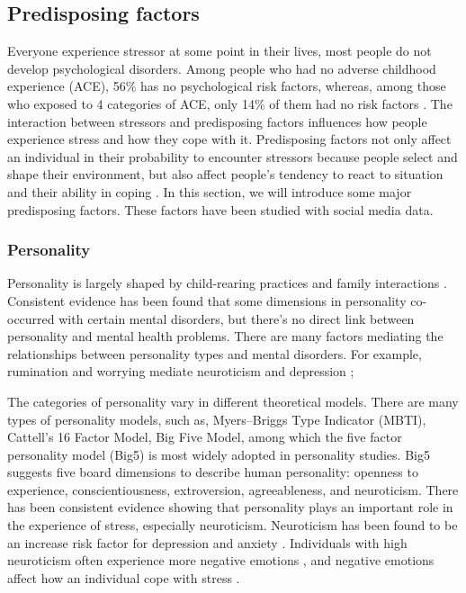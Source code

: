 \subsection{Predisposing factors}
Everyone experience stressor at some point in their lives, most people do not develop psychological disorders. Among people who had no adverse childhood experience (ACE), 56\% has no psychological risk factors, whereas, among those who exposed to 4 categories of ACE, only 14\% of them had no risk factors \cite{felitti1998relationship}. The interaction between stressors and predisposing factors influences how people experience stress and how they cope with it. Predisposing factors not only affect an individual in their probability to encounter stressors because people select and shape their environment, but also affect people's tendency to react to situation and their ability in coping \cite{suls2005daily,vollrath2001personality,watson1999personality}. In this section, we will introduce some major predisposing factors. These factors have been studied with social media data. 

\subsubsection{Personality}
Personality is largely shaped by child-rearing practices and family interactions \cite{kluft1985childhood}. Consistent evidence has been found that some dimensions in personality co-occurred with certain mental disorders, but there's no direct link between personality and mental health problems. There are many factors mediating the relationships between personality types and mental disorders. For example, rumination and worrying mediate neuroticism and depression \cite{roelofs2008rumination};

The categories of personality vary in different theoretical models. There are many types of personality models, such as, Myers–Briggs Type Indicator (MBTI), Cattell’s 16 Factor Model, Big Five Model, among which the five factor personality model (Big5) is most widely adopted in personality studies. Big5 suggests five board dimensions to describe human personality:  openness to experience, conscientiousness, extroversion, agreeableness, and neuroticism. There has been consistent evidence showing that personality plays an important role in the experience of stress, especially neuroticism. Neuroticism has been found to be an increase risk factor for depression and anxiety \cite{talley1986association,cattell1961meaning}. Individuals with high neuroticism often experience more negative emotions \cite{larsen1991personality}, and negative emotions affect how an individual cope with stress \cite{kiecolt2002emotions}.  

